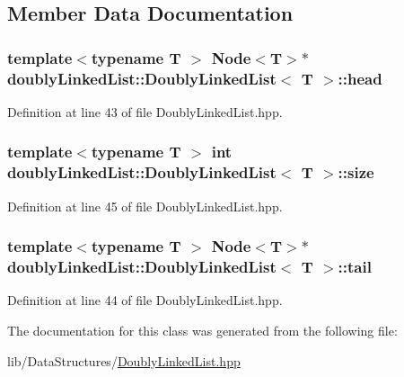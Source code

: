 \subsection{Member Data Documentation}
\hypertarget{classdoublyLinkedList_1_1DoublyLinkedList_ab29d146595ee66d859611599bbccc19d}{
\subsubsection[{head}]{\setlength{\rightskip}{0pt plus 5cm}template$<$typename T $>$ {\bf Node}$<$T$>$$\ast$ {\bf doubly\-Linked\-List\-::\-Doubly\-Linked\-List}$<$ T $>$\-::head\hspace{0.3cm}{\ttfamily [private]}}}\label{classdoublyLinkedList_1_1DoublyLinkedList_ab29d146595ee66d859611599bbccc19d}


Definition at line 43 of file Doubly\-Linked\-List.\-hpp.

\hypertarget{classdoublyLinkedList_1_1DoublyLinkedList_a894259d7ab4a0e16bf3a1221d1d4bc75}{
\subsubsection[{size}]{\setlength{\rightskip}{0pt plus 5cm}template$<$typename T $>$ int {\bf doubly\-Linked\-List\-::\-Doubly\-Linked\-List}$<$ T $>$\-::size\hspace{0.3cm}{\ttfamily [private]}}}\label{classdoublyLinkedList_1_1DoublyLinkedList_a894259d7ab4a0e16bf3a1221d1d4bc75}


Definition at line 45 of file Doubly\-Linked\-List.\-hpp.

\hypertarget{classdoublyLinkedList_1_1DoublyLinkedList_af31f560be2e8532064d74d1c2466a114}{
\subsubsection[{tail}]{\setlength{\rightskip}{0pt plus 5cm}template$<$typename T $>$ {\bf Node}$<$T$>$$\ast$ {\bf doubly\-Linked\-List\-::\-Doubly\-Linked\-List}$<$ T $>$\-::tail\hspace{0.3cm}{\ttfamily [private]}}}\label{classdoublyLinkedList_1_1DoublyLinkedList_af31f560be2e8532064d74d1c2466a114}


Definition at line 44 of file Doubly\-Linked\-List.\-hpp.



The documentation for this class was generated from the following file\-:\begin{DoxyCompactItemize}
\item 
lib/\-Data\-Structures/\hyperlink{DoublyLinkedList_8hpp}{Doubly\-Linked\-List.\-hpp}\end{DoxyCompactItemize}
